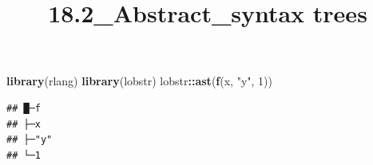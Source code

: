 \documentclass[]{article}
\title{18.2\_Abstract\_syntax trees}
\author{}
\date{}
\newenvironment{Shaded}{\begin{snugshade}}{\end{snugshade}}
\newcommand{\DecValTok}[1]{\textcolor[rgb]{0.00,0.00,0.81}{#1}}
\newcommand{\KeywordTok}[1]{\textcolor[rgb]{0.13,0.29,0.53}{\textbf{#1}}}
\newcommand{\NormalTok}[1]{#1}
\newcommand{\OperatorTok}[1]{\textcolor[rgb]{0.81,0.36,0.00}{\textbf{#1}}}
\newcommand{\StringTok}[1]{\textcolor[rgb]{0.31,0.60,0.02}{#1}}
\begin{document}
\maketitle

\begin{Shaded}
\begin{Highlighting}[]
\KeywordTok{library}\NormalTok{(rlang)}
\KeywordTok{library}\NormalTok{(lobstr)}
\NormalTok{lobstr}\OperatorTok{::}\KeywordTok{ast}\NormalTok{(}\KeywordTok{f}\NormalTok{(x, }\StringTok{"y"}\NormalTok{, }\DecValTok{1}\NormalTok{))}
\end{Highlighting}
\end{Shaded}

\begin{verbatim}
## █─f 
## ├─x 
## ├─"y" 
## └─1
\end{verbatim}
\end{document}
